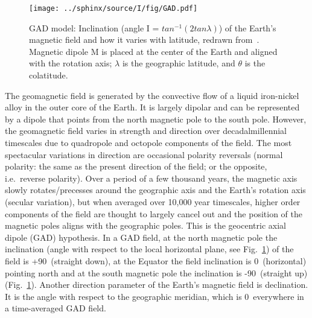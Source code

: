 \begin{figure}
    \centering
        \texttt{[image: ../sphinx/source/I/fig/GAD.pdf]}
    \captionsetup{width=.95\textwidth}
	\caption{GAD model: Inclination (angle I = $tan^{-1}(2tan\lambda)$) of the
	Earth's magnetic field and how it varies with latitude, redrawn
	from~\cite{B92,T19,T08}. Magnetic dipole M is placed at the center of the
	Earth and aligned with the rotation axis; $\lambda$ is the geographic
	latitude, and $\theta$ is the colatitude.}\label{Fig:chap_intro_gad}
\end{figure}

The geomagnetic field is generated by the convective flow of a liquid
iron-nickel alloy in the outer core of the Earth. It is largely dipolar and can
be represented by a dipole that points from the north magnetic pole to the south
pole. However, the geomagnetic field varies in strength and direction over
decadal\textendash{}millennial timescales due to quadropole and octopole
components of the field. The most spectacular variations in direction are
occasional polarity reversals (normal polarity: the same as the present
direction of the field; or the opposite, i.e.\ reverse polarity). Over a period
of a few thousand years, the magnetic axis slowly rotates/precesses around the
geographic axis and the Earth's rotation axis (secular variation), but when
averaged over 10,000 year timescales, higher order components of the field are
thought to largely cancel out and the position of the magnetic poles aligns with
the geographic poles. This is the geocentric axial dipole (GAD) hypothesis. In a
GAD field, at the north magnetic pole the inclination (angle with respect to the
local horizontal plane, see Fig.~\ref{Fig:chap_intro_gad}) of the field is
+90\degree\ (straight down), at the Equator the field inclination is 0\degree\
(horizontal) pointing north and at the south magnetic pole the inclination is
-90\degree\ (straight up) (Fig.~\ref{Fig:chap_intro_gad}). Another direction
parameter of the Earth's magnetic field is declination. It is the angle with
respect to the geographic meridian, which is 0\degree\ everywhere in a
time-averaged GAD field.

